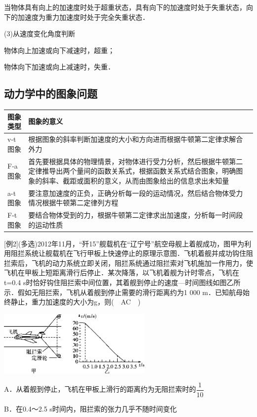 当物体具有向上的加速度时处于超重状态，具有向下的加速度时处于失重状态，向下的加速度为重力加速度时处于完全失重状态．

(3)从速度变化角度判断

物体向上加速或向下减速时，超重；

物体向下加速或向上减速时，失重．
\newpage
\subsection{动力学中的图象问题}

\begin{longtable}[]{@{}m{2cm}m{13cm}@{}}
\toprule
图象类型 & 图象的意义\tabularnewline
\midrule
\endhead
v-t图象 &
根据图象的斜率判断加速度的大小和方向进而根据牛顿第二定律求解合外力\tabularnewline
F-a图象 &
首先要根据具体的物理情景，对物体进行受力分析，然后根据牛顿第二定律推导出两个量间的函数关系式，根据函数关系式结合图象，明确图象的斜率、截距或面积的意义，从而由图象给出的信息求出未知量\tabularnewline
a-t图象 &
要注意加速度的正负，正确分析每一段的运动情况，然后结合物体受力情况根据牛顿第二定律列方程\tabularnewline
F-t图象 &
要结合物体受到的力，根据牛顿第二定律求出加速度，分析每一时间段的运动性质\tabularnewline
\bottomrule
\end{longtable}

{[}例2{]}(多选)2012年11月，``歼15''舰载机在``辽宁号''航空母舰上着舰成功，图甲为利用阻拦系统让舰载机在飞行甲板上快速停止的原理示意图．飞机着舰并成功钩住阻拦索后，飞机的动力系统立即关闭，阻拦系统通过阻拦索对飞机施加一作用力，使飞机在甲板上短距离滑行后停止．某次降落，以飞机着舰为计时零点，飞机在t=0.4
s时恰好钩住阻拦索中间位置，其着舰到停止的速度---时间图线如图乙所示．假如无阻拦索，飞机从着舰到停止需要的滑行距离约为1
000 m．已知航母始终静止，重力加速度的大小为g，则(　AC　)

\begin{center}\includegraphics[width=2.95833in,height=1.25in]{media/image117.png}\end{center}

A．从着舰到停止，飞机在甲板上滑行的距离约为无阻拦索时的$\dfrac{1}{10}$

B．在0.4～2.5 s时间内，阻拦索的张力几乎不随时间变化

